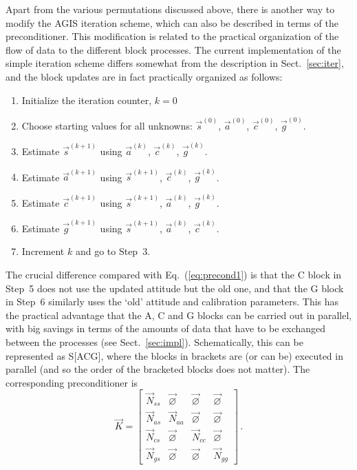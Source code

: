 \documentclass[structabstract]{aa}
\begin{document}
Apart from the various permutations discussed above, there is another
way to modify the AGIS iteration scheme, which can also be described
in terms of the preconditioner. This modification is related to the
practical organization of the flow of data to the different block
processes. The current implementation of the simple iteration scheme
differs somewhat from the description in Sect.~\ref{sec:iter}, and the
block updates are in fact practically organized as follows:
\begin{enumerate}
\item
Initialize the iteration counter, $k=0$
\item
Choose starting values for all unknowns: $\vec{s}^{(0)}$, $\vec{a}^{(0)}$,
$\vec{c}^{(0)}$, $\vec{g}^{(0)}$.
\item
Estimate $\vec{s}^{(k+1)}$ using $\vec{a}^{(k)}$, $\vec{c}^{(k)}$, $\vec{g}^{(k)}$.
\item
Estimate $\vec{a}^{(k+1)}$ using $\vec{s}^{(k+1)}$, $\vec{c}^{(k)}$, $\vec{g}^{(k)}$.
\item
Estimate $\vec{c}^{(k+1)}$ using $\vec{s}^{(k+1)}$, $\vec{a}^{(k)}$, $\vec{g}^{(k)}$.
\item
Estimate $\vec{g}^{(k+1)}$ using $\vec{s}^{(k+1)}$, $\vec{a}^{(k)}$, $\vec{c}^{(k)}$.
\item
Increment $k$ and go to Step~3.
\end{enumerate}
The crucial difference compared with Eq.~(\ref{eq:precond1}) is that the C block
in Step~5 does not use the updated attitude but the old one, and that the G block
in Step~6 similarly uses the `old' attitude and calibration parameters. This has
the practical advantage that the A, C and G blocks can be carried out in parallel,
with big savings in terms of the amounts of data that have to be exchanged between
the processes (see Sect.~\ref{sec:impl}). Schematically, this can be represented
as S[ACG], where the blocks in brackets are (or can be) executed in parallel
(and so the order of the bracketed blocks does not matter). The corresponding
preconditioner is
\begin{equation}\label{eq:precondS(CAG)}
\vec{K} =
    \begin{bmatrix}
        \vec{N}_{ss} & \vec{\varnothing} & \vec{\varnothing} & \vec{\varnothing} \\
        \vec{N}_{as} & \vec{N}_{aa}      & \vec{\varnothing} & \vec{\varnothing} \\
        \vec{N}_{cs} & \vec{\varnothing} & \vec{N}_{cc}      & \vec{\varnothing} \\
        \vec{N}_{gs} & \vec{\varnothing} & \vec{\varnothing} & \vec{N}_{gg}
    \end{bmatrix} \, .
\end{equation}
\end{document}

